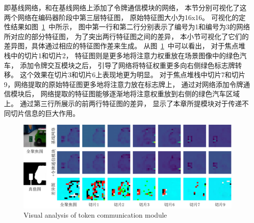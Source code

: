 即基线网络，和在基线网络上添加了令牌通信模块的网络，
本节分别可视化了这两个网络在编码器阶段中第三层特征图，
原始特征图大小为16x16。
可视化的定性结果如图~\ref{chpt3:figure:attn_tcm}~中所示，
图中第一行和第二行分别表示了编号为1和编号为3的网络所对应的部分特征图，
为了突出两行特征图之间的差异，
本小节可视化了它们的差异图，具体通过相应的特征图作差来生成。
从图~\ref{chpt3:figure:attn_tcm}~中可以看出，
对于焦点堆栈中的切片1和切片2，
特征图则是更多地将注意力权重放在场景图像中的绿色汽车，
添加令牌交互模块之后，
引导了网络将特征权重更多向右侧绿色标志牌转移。
这个效果在切片3和切片6上表现地更为明显。
对于焦点堆栈中切片7和切片9，网络提取的原始特征图更多地将注意力放在标志牌上，
通过对网络添加令牌通信模块后，
网络提取的特征图能够逐渐地将注意权重放到右侧的绿色汽车区域上。
通过第三行所展示的前两行特征图的差异，
显示了本章所提模块对于传递不同切片信息的巨大作用。
%
%
%
%
%
%
\begin{figure}[t] 
 	\includegraphics[width=0.99\linewidth]{figures/chapter3/attn_cmp_turn} 
 	\centering
 	{Visual analysis of token communication module}
 	\label{chpt3:figure:attn_tcm}
\end{figure}
%
%
